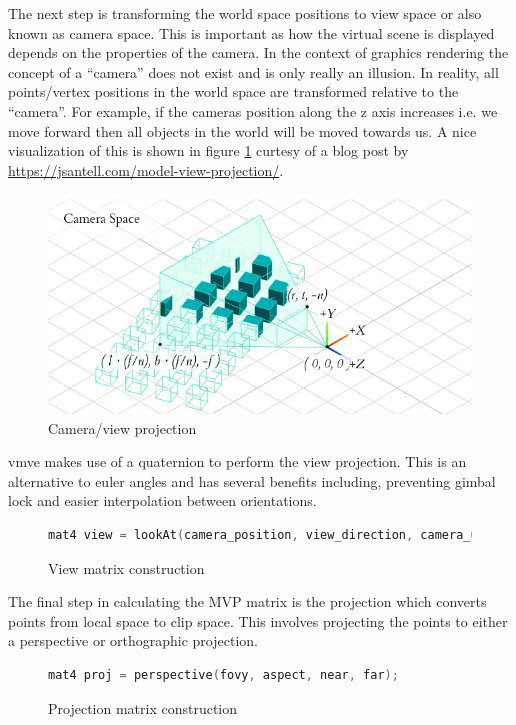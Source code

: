 \documentclass[11pt]{article}
\begin{document}
The next step is transforming the world space positions to view space or also
known as camera space. This is important as how the virtual scene is displayed
depends on the properties of the camera. In the context of graphics rendering
the concept of a ``camera'' does not exist and is only really an illusion. In
reality, all points/vertex positions in the world space are transformed relative
to the ``camera''. For example, if the cameras position along the z axis
increases i.e. we move forward then all objects in the world will be moved
towards us. A nice visualization of this is shown in figure
\ref{fig:camera_projection} curtesy of a blog post by \href{Jordan
Santell}{https://jsantell.com/model-view-projection/}.

\begin{figure}[h!]
  \centering
  \includegraphics[width=\textwidth]{images/camera_space.png}
  \caption{Camera/view projection \cite{camera_projection}}
  \label{fig:camera_projection} 
\end{figure}

\gls{vmve} makes use of a quaternion to perform the view projection. This is an
alternative to euler angles and has several benefits including, preventing gimbal
lock and easier interpolation between orientations.
\begin{figure}[ht]
  \centering
  \begin{lstlisting}[language=C++]
    mat4 view = lookAt(camera_position, view_direction, camera_up);
  \end{lstlisting}
  \caption{View matrix construction}
  \label{fig:world_to_view}
\end{figure}


The final step in calculating the MVP matrix is the projection which converts
points from local space to clip space. This involves projecting the points to
either a perspective or orthographic projection.
\begin{figure}[ht]
  \centering
  \begin{lstlisting}[language=C++]
    mat4 proj = perspective(fovy, aspect, near, far);
  \end{lstlisting}
  \caption{Projection matrix construction}
  \label{fig:local_to_projection}
\end{figure}
\end{document}
